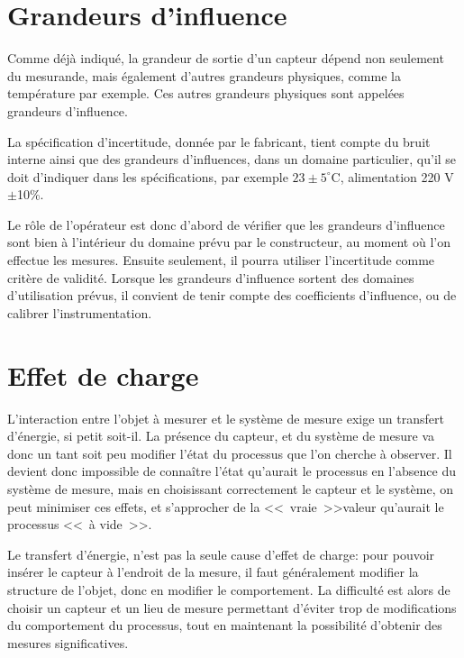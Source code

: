 \section{Grandeurs d'influence}

Comme déjà indiqué, la grandeur de sortie d'un capteur dépend non seulement du mesurande, mais également d'autres grandeurs physiques, comme la température par exemple. Ces autres grandeurs physiques sont appelées grandeurs d'influence.

La spécification d'incertitude, donnée par le fabricant, tient compte du bruit interne ainsi que des grandeurs d'influences, dans un domaine particulier, qu'il se doit d'indiquer dans les spécifications, par exemple $23\pm5^\circ$C, alimentation 220 V$\pm$10\%.

Le rôle de l'opérateur est donc d'abord de vérifier que les grandeurs d'influence sont bien à l'intérieur du domaine prévu par le constructeur, au moment où l'on effectue les mesures. Ensuite seulement, il pourra utiliser l'incertitude comme critère de validité. Lorsque les grandeurs d'influence sortent des domaines d'utilisation prévus, il convient de tenir compte des coefficients d'influence, ou de calibrer l'instrumentation.

\section{Effet de charge}

L'interaction entre l'objet à mesurer et le système de mesure exige un transfert d'énergie, si petit soit-il. La présence du capteur, et du système de mesure va donc un tant soit peu modifier l'état du processus que l'on cherche à observer. Il devient donc impossible de connaître l'état qu'aurait le processus en l'absence du système de mesure, mais en choisissant correctement le capteur et le système, on peut minimiser ces effets, et s'approcher de la \textless\textless\ vraie\ \textgreater\textgreater valeur qu'aurait le processus \textless\textless\ à vide\ \textgreater\textgreater.

Le transfert d'énergie, n'est pas la seule cause d'effet de charge: pour pouvoir insérer le capteur à l'endroit de la mesure, il faut généralement modifier la structure de l'objet, donc en modifier le comportement. La difficulté est alors de choisir un capteur et un lieu de mesure permettant d'éviter trop de modifications du comportement du processus, tout en maintenant la possibilité d'obtenir des mesures significatives.

